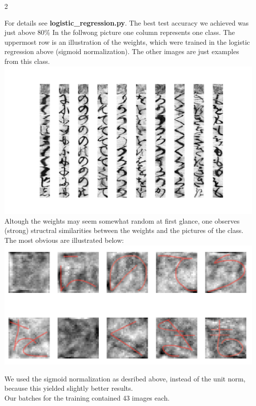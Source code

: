 \documentclass{article}
\begin{document}
\begin{ukon-infie}[3.12.17]{2}
\begin{exercise}[p=45]{}
{			}
			\question{}
			{
			For details see \textbf{logistic\_regression.py}.	
			The best test accuracy we achieved was just above 80\%}
			\question{}
			{
			In the follwong picture one column represents one class. The uppermost row is an illustration of the weights, which were trained in the logistic regression above (sigmoid normalization). The other images are just examples from this class.\\\includegraphics[scale=0.5]{weights.png}}   \\	
			Altough the weights may seem somewhat random at first glance, one observes (strong) structral similarities between the weights and the pictures of the class. The most obvious are  illustrated below:\\
			\includegraphics[scale=0.5]{weights_similarities.png}
		\end{exercise}
		
		\begin{exercise}[p=55]{}
			\question{}
			{
			We used the sigmoid normalization as desribed above, instead of the unit norm, because this yielded slightly better results.\\
			Our batches for the training contained 43 images each.
			}
\end{exercise}
\end{ukon-infie}
\end{document}
